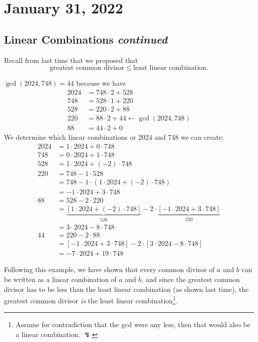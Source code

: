 \section{January 31, 2022}
\subsection{Linear Combinations \emph{continued}}
Recall from last time that we proposed that
\[\text{greatest common divisor} \leq \text{least linear combination}.\]
\begin{example}
    $\gcd(2024, 748)=44$ because we have
    \begin{align*}
        2024 & = 748\cdot 2 + 528                                  \\
        748  & = 528\cdot 1 + 220                                  \\
        528  & = 220\cdot 2 + 88                                   \\
        220  & = 88\cdot 2 + \boxed{44} \leftarrow \gcd(2024, 748) \\
        88   & = 44\cdot 2 + 0
    \end{align*}
    We determine which linear combinations or $2024$ and $748$ we can create:
    \begin{align*}
        2024 & = 1\cdot 2024 + 0\cdot 748                         \\
        748  & = 0\cdot 2024 + 1\cdot 748                         \\
        528  & = 1\cdot 2024 + (-2)\cdot 748                      \\
        220  & = 748 - 1\cdot 528                                 \\
             & = 748 - 1\cdot (1\cdot 2024 + (-2)\cdot 748)       \\
             & = -1\cdot 2024 + 3\cdot 748                        \\
        88   & = 528 - 2\cdot 220                                 \\
             & = \underbrace{[1\cdot 2024 + (-2)\cdot 748]}_{528}
        - 2\cdot \underbrace{[-1\cdot 2024 + 3\cdot 748]}_{220}   \\
             & = 3\cdot 2024 - 8\cdot 748                         \\
        44   & = 220 - 2\cdot 88                                  \\
             & = [-1\cdot 2024 + 3\cdot 748]
        - 2\cdot [3\cdot 2024 - 8\cdot 748]                       \\
             & = -7\cdot 2024 + 19\cdot 748
    \end{align*}
\end{example}
Following this example, we have shown that every common divisor of $a$ and $b$ can be written as a linear combination of $a$ and $b$, and since the greatest common divisor has to be less than the least linear combination (as shown last time), the greatest common divisor \emph{is} the least linear combination\footnote{Assume for contradiction that the gcd were any less, then that would also be a linear combination. $\lightning$}.

